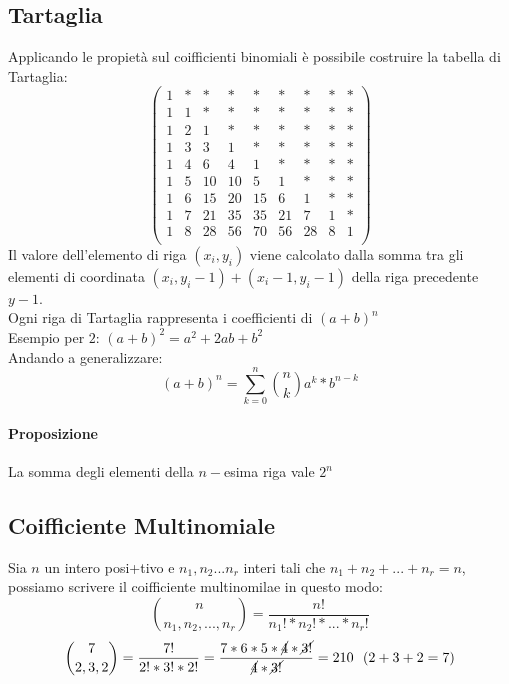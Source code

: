 \subsection{Tartaglia}
Applicando le propietà sul coifficienti binomiali è possibile costruire la tabella di Tartaglia:\\
$$
\begin{pmatrix}
1 & * & * & * & * & * & * & * & * \\
1 & 1 & * & * & * & * & * & * & *\\
1 & 2 & 1 & * & * & * & * & * & *\\
1 & 3 & 3 & 1 & * & * & * & * & *\\
1 & 4 & 6 & 4 & 1 & * & * & * & *\\
1 & 5 & 10 & 10 & 5 & 1 & * & * & *\\
1 & 6 & 15 & 20 & 15 & 6 & 1 & * & *\\
1 & 7 & 21 & 35 & 35 & 21 & 7 & 1 & *\\
1 & 8 & 28 & 56 & 70 & 56 & 28 & 8 & 1 \\

\end{pmatrix}
$$
Il valore dell'elemento di riga $(x_i,y_i)$ viene calcolato dalla somma tra gli elementi di coordinata $ (x_i,y_i-1) + (x_i-1, y_i-1)$ della riga precedente $y-1$.\\
Ogni riga di Tartaglia rappresenta i coefficienti di $(a+b)^n$\\
Esempio per $2$: $ (a+b)^2 = a^2+2ab+b^2$\\
Andando a generalizzare:\\
$$ (a+b)^n = \sum_{k=0}^{n} \binom{n}{k} a^k*b^{n-k}$$
\paragraph{Proposizione}
La somma degli elementi della $n-$esima riga vale $2^n$

\iffalse
\subsection{Coifficiente Multinomiale}
Sia $n$ un intero posi+tivo e $n_1,n_2...n_r$ interi tali che $n_1+n_2+...+n_r = n$, possiamo scrivere il coifficiente multinomilae in questo modo:
$$ \binom{n}{n_1,n_2,...,n_r} = \frac{n!}{n_1!*n_2!*...*n_r!} $$
$$ \binom{7}{2,3,2} = \frac{7!}{2!*3!*2!} = \frac{7*6*5*\cancel{4}*\cancel{3!}}{\cancel{4}*\cancel{3!}} = 210 \:\:\:(2+3+2 = 7) $$
\newpage

